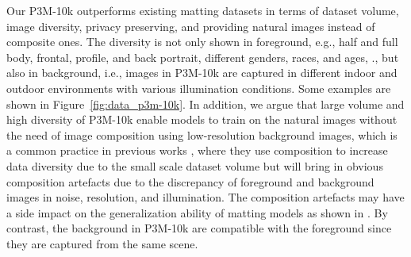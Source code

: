 \documentclass[twocolumn]{svjour3}
\begin{document}
Our P3M-10k outperforms existing matting datasets in terms of dataset volume, image diversity, privacy preserving, and providing natural images instead of composite ones. The diversity is not only shown in foreground, e.g., half and full body, frontal, profile, and back portrait, different genders, races, and ages, ., but also in background, i.e., images in P3M-10k are captured in different indoor and outdoor environments with various illumination conditions. Some examples are shown in Figure~\ref{fig:data_p3m-10k}. In addition, we argue that large volume and high diversity of P3M-10k enable models to train on the natural images without the need of image composition using low-resolution background images, which is a common practice in previous works \citep{dim, hatt}, where they use composition to increase data diversity due to the small scale dataset volume but will bring in obvious composition artefacts due to the discrepancy of foreground and background images in noise, resolution, and illumination. The composition artefacts may have a side impact on the generalization ability of matting models as shown in \citep{gfm}. By contrast, the background in P3M-10k are compatible with the foreground since they are captured from the same scene.

\begin{table*}[htb]
\begin{center}
\end{center}
\caption{Results of trimap-based traditional methods on the blurred images (``B'') and normal images (``N'') in P3M-500-P.}
\label{tab:benchmark_trimap_based_traditional}
\end{table*}
\end{document}
